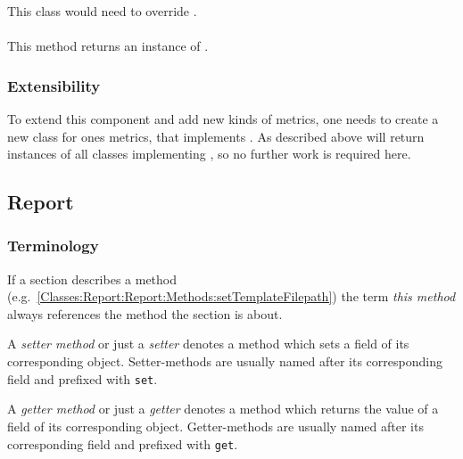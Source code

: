 \subsubsection{} \label{Classes:Metrics:LoopCoverage}

This class would need to override .

\paragraph{} \label{Classes:Metrics:LoopCoverage:getInstance}
This method returns an instance of .

\subsubsection{Extensibility}

To extend this component and add new kinds of metrics, one needs to create a new class for ones metrics, that implements . As described above  will return instances of all classes implementing , so no further work is required here.


\subsection{Report} \label{Classes:Report}
\sloppy %


\subsubsection{Terminology}

If a section describes a method (e.g.~\ref{Classes:Report:Report:Methods:setTemplateFilepath}) the term \emph{this method} always references the method the section is about.

A \emph{setter method} or just a \emph{setter} denotes a method which sets a field of its corresponding object. Setter-methods are usually named after its corresponding field and prefixed with \texttt{set}.

A \emph{getter method} or just a \emph{getter} denotes a method which returns the value of a field of its corresponding object. Getter-methods are usually named after its corresponding field and prefixed with \texttt{get}.

